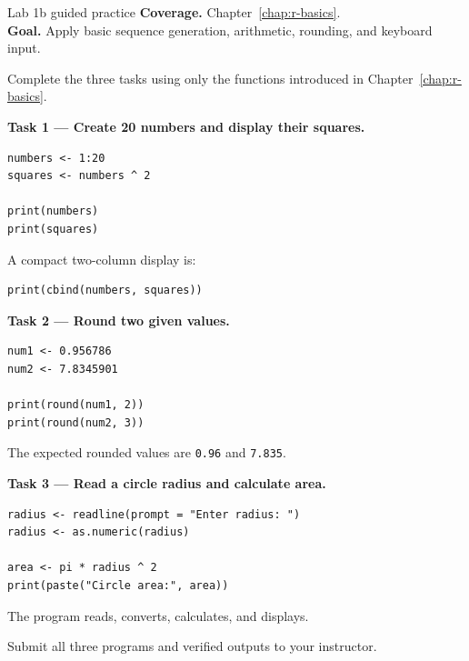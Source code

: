 
\begin{labproject}{Lab 1b guided practice}
\textbf{Coverage.} Chapter~\ref{chap:r-basics}.\\
\textbf{Goal.} Apply basic sequence generation, arithmetic, rounding, and keyboard input.

\begin{labmode}
Complete the three tasks using only the functions introduced in Chapter~\ref{chap:r-basics}.
\end{labmode}

\textbf{Task 1 --- Create 20 numbers and display their squares.}

\begin{lstlisting}[style=dsr]
numbers <- 1:20
squares <- numbers ^ 2

print(numbers)
print(squares)
\end{lstlisting}

A compact two-column display is:

\begin{lstlisting}[style=dsr]
print(cbind(numbers, squares))
\end{lstlisting}

\textbf{Task 2 --- Round two given values.}

\begin{lstlisting}[style=dsr]
num1 <- 0.956786
num2 <- 7.8345901

print(round(num1, 2))
print(round(num2, 3))
\end{lstlisting}

The expected rounded values are \texttt{0.96} and \texttt{7.835}.

\textbf{Task 3 --- Read a circle radius and calculate area.}

\begin{lstlisting}[style=dsr]
radius <- readline(prompt = "Enter radius: ")
radius <- as.numeric(radius)

area <- pi * radius ^ 2
print(paste("Circle area:", area))
\end{lstlisting}

The program reads, converts, calculates, and displays.
\end{labproject}

\begin{labdeliverable}
Submit all three programs and verified outputs to your instructor.
\end{labdeliverable}
